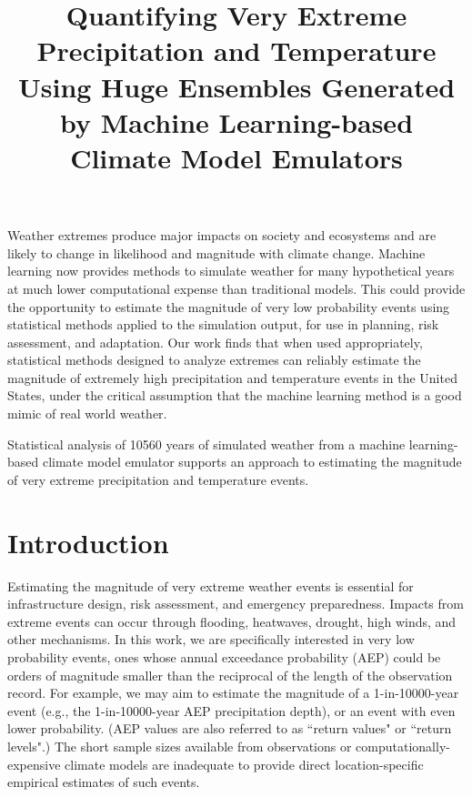 \documentclass{ametsocV6.1}
\title{Quantifying Very Extreme Precipitation and Temperature Using Huge Ensembles Generated by Machine Learning-based Climate Model Emulators}
\affiliation{\aff{a}Department of Statistics, University of California, Berkeley, California, United States\\ \aff{b}Department of Statistics, Colorado State University, Fort Collins, Colorado, United States}
\begin{document}
\maketitle 
\statement   
Weather extremes produce major impacts on society and ecosystems and are likely to change in likelihood and magnitude with climate change. Machine learning now provides methods to simulate weather for many hypothetical years at much lower computational expense than traditional models. This could provide the opportunity to estimate the magnitude of very low probability events using statistical methods applied to the simulation output, for use in planning, risk assessment, and adaptation. Our work finds that when used appropriately, statistical methods designed to analyze extremes can reliably estimate the magnitude of extremely high precipitation and temperature events in the United States, under the critical assumption that the machine learning method is a good mimic of real world weather.  

\capsule 
Statistical analysis of 10560 years of simulated weather from a machine learning-based climate model emulator supports an approach to estimating the magnitude of very extreme precipitation and temperature events.

\section{Introduction}

Estimating the magnitude of very extreme weather events is essential for infrastructure design, 
risk assessment, and emergency preparedness.  %
Impacts from extreme events can occur through flooding, heatwaves, drought, high winds, and other mechanisms.
In this work, we are specifically interested in very low probability events, ones whose annual exceedance probability (AEP) could be orders of magnitude smaller than the reciprocal of the length of the observation record.
For example, we may aim to estimate the magnitude of a 1-in-10000-year event (e.g., the 1-in-10000-year AEP precipitation depth), or an event with even lower probability. (AEP values are also referred to as ``return values" or ``return levels".)
The short sample sizes available from observations or computationally-expensive climate models are inadequate to provide direct location-specific empirical estimates of such events. 
\end{document}
